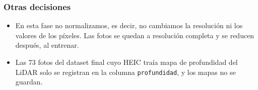 \subsubsection*{Otras decisiones}

\begin{itemize}
  \item En esta fase no normalizamos, es decir, no cambiamos la resolución ni los valores de los píxeles. Las fotos se quedan a resolución completa y se reducen después, al entrenar.
  \item Las 73 fotos del dataset final cuyo HEIC traía mapa de profundidad del LiDAR solo se registran en la columna \texttt{profundidad}, y los mapas no se guardan.
\end{itemize}
